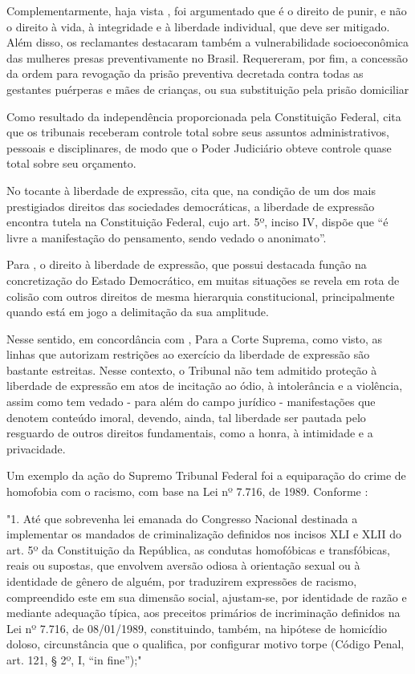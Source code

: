 Complementarmente, haja vista \cite{hc143641}, foi argumentado que é o direito de punir, e não o direito à vida, à  integridade e à liberdade individual, que deve ser mitigado. Além disso, os reclamantes destacaram também a vulnerabilidade socioeconômica das mulheres presas preventivamente no Brasil. Requereram, por fim, a concessão da ordem para revogação da prisão preventiva decretada contra todas as gestantes puérperas e mães de crianças, ou sua substituição pela prisão domiciliar

Como resultado da independência proporcionada pela Constituição Federal, \cite{pires2021paradoxo} cita que os tribunais receberam controle total sobre seus assuntos administrativos, pessoais e disciplinares, de modo que o Poder Judiciário obteve controle quase total sobre seu orçamento.

No tocante à liberdade de expressão, \cite{daliberdade} cita que, na condição de um dos mais prestigiados direitos das sociedades democráticas, a liberdade de expressão encontra tutela na Constituição Federal, cujo art. 5º, inciso IV, dispõe que “é livre a manifestação do pensamento, sendo vedado o anonimato”.

Para \cite{daliberdade}, o direito à liberdade de expressão, que possui destacada função na concretização do Estado Democrático, em muitas situações se revela em rota de colisão com outros direitos de mesma hierarquia constitucional, principalmente quando está em jogo a delimitação da sua amplitude. 

Nesse sentido, em concordância com \cite{daliberdade}, Para a Corte Suprema, como visto, as linhas que autorizam restrições ao exercício da liberdade de expressão são bastante estreitas. Nesse contexto, o Tribunal não tem admitido proteção à liberdade de expressão em atos de incitação ao ódio, à intolerância e a violência, assim como tem vedado - para além do campo jurídico - manifestações que denotem conteúdo imoral, devendo, ainda, tal liberdade ser pautada pelo resguardo de outros direitos
fundamentais, como a honra, à intimidade e a privacidade.

Um exemplo da ação do Supremo Tribunal Federal foi a equiparação do crime de homofobia com o racismo, com base na Lei nº 7.716, de 1989. Conforme \cite{ado26}:

\noindent
\begin{flushleft}
\setlength{\leftskip}{4cm}
\small
"1. Até que sobrevenha lei emanada do Congresso Nacional destinada a
implementar os mandados de criminalização definidos nos incisos XLI e XLII do
art. 5º da Constituição da República, as condutas homofóbicas e transfóbicas, reais ou
supostas, que envolvem aversão odiosa à orientação sexual ou à identidade de gênero de
alguém, por traduzirem expressões de racismo, compreendido este em sua dimensão
social, ajustam-se, por identidade de razão e mediante adequação típica, aos preceitos
primários de incriminação definidos na Lei nº 7.716, de 08/01/1989, constituindo,
também, na hipótese de homicídio doloso, circunstância que o qualifica, por configurar motivo torpe (Código Penal, art. 121, § 2º, I, “in fine”);" \cite{ado26}
\end{flushleft}

